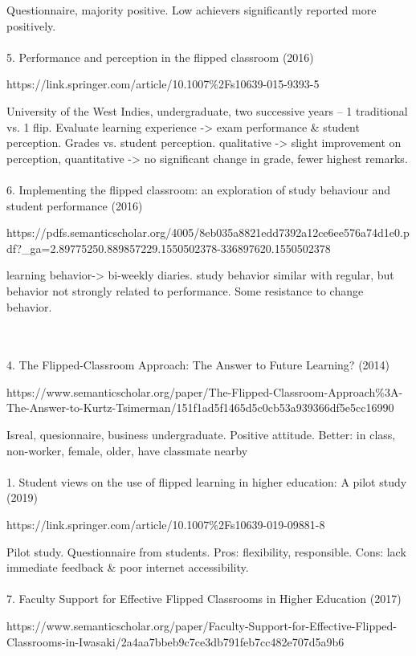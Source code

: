 \documentclass[onecolumn,aps,prd,groupedaddress,nofootinbib,notitlepage,12pt]{revtex4-1}
\begin{document}
Questionnaire, majority positive.  Low achievers significantly reported more positively.
\\\\
5.  Performance and perception in the flipped classroom (2016)

https://link.springer.com/article/10.1007\%2Fs10639-015-9393-5

University of the West Indies, undergraduate, two successive years -- 1 traditional vs. 1 flip.
Evaluate learning experience -> exam performance & student perception.
Grades vs. student perception.
qualitative -> slight improvement on perception, quantitative -> no significant change in grade, fewer highest remarks.
\\\\
6. Implementing the flipped classroom: an exploration of study behaviour and student performance (2016)

https://pdfs.semanticscholar.org/4005/8eb035a8821edd7392a12ce6ee576a74d1e0.pdf?_ga=2.89775250.889857229.1550502378-336897620.1550502378

learning behavior-> bi-weekly diaries. 
study behavior similar with regular, but behavior not strongly related to performance.
Some resistance to change behavior.


\\\\
4. The Flipped-Classroom Approach: The Answer to Future Learning? (2014)

https://www.semanticscholar.org/paper/The-Flipped-Classroom-Approach\%3A-The-Answer-to-Kurtz-Tsimerman/151f1ad5f1465d5c0cb53a939366df5e5cc16990

Isreal, quesionnaire,  business undergraduate.
Positive attitude.
Better: in class, non-worker, female, older, have classmate nearby
\\\\
1. Student views on the use of flipped learning in higher education: A pilot study (2019)

https://link.springer.com/article/10.1007\%2Fs10639-019-09881-8

Pilot study. Questionnaire from students.
Pros: flexibility, responsible. 
Cons: lack immediate feedback \& poor internet accessibility.
\\\\
7. Faculty Support for Effective Flipped Classrooms in Higher Education (2017)

https://www.semanticscholar.org/paper/Faculty-Support-for-Effective-Flipped-Classrooms-in-Iwasaki/2a4aa7bbeb9c7ce3db791feb7cc482e707d5a9b6
\end{document}
